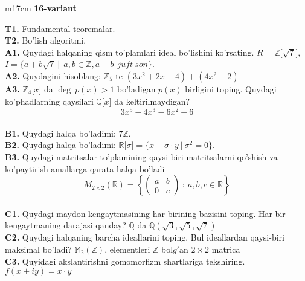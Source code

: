 \documentclass{article}
\begin{document}
\begin{tabular}{m{17cm}}
\textbf{16-variant}
\newline

\textbf{T1.} Fundamental teoremalar. \\
\textbf{T2.} Bo'lish algoritmi. \\
\textbf{A1.} Quydagi halqaning qism to'plamlari ideal bo'lishini ko'rsating.
\(R\mathbb{= Z\lbrack}\sqrt{7}\rbrack\), \(I = \{ a + b\sqrt{7}\ |\ \ a,b \in \mathbb{Z,}a - b\ \ juft\ son\}\). \\
\textbf{A2.} Quydagini hisoblang:
\(\mathbb{Z}_{5}\) te \(\left( 3x^{2} + 2x - 4 \right) + \left( 4x^{2} + 2 \right)\) \\
\textbf{A3.} \(\mathbb{Z}_{4}\lbrack x\rbrack\) da \(\deg\ p(x) > 1\) bo'ladigan \(p(x)\) birligini toping. Quydagi ko'phadlarning qaysilari \(\mathbb{Q\lbrack}x\rbrack\) da keltirilmaydigan?
\[3x^{5} - 4x^{3} - 6x^{2} + 6\] \\
\textbf{B1.} Quydagi halqa bo'ladimi:
\(7\mathbb{Z}\). \\
\textbf{B2.} Quydagi halqa bo'ladimi:
\(\mathbb{R\lbrack}\sigma\rbrack = \{ x + \sigma \cdot y\ |\ \sigma^{2} = 0\}\). \\
\textbf{B3.} Quydagi matritsalar to'plamining qaysi biri matritsalarni qo'shish va ko'paytirish amallarga qarata halqa bo'ladi
\[M_{2 \times 2}\mathbb{(R) =}\left\{ \begin{pmatrix}
a & b \\
0 & c
\end{pmatrix}\ :\ a,b,c \in \mathbb{R} \right\}\] \\
\textbf{C1.} Quydagi maydon kengaytmasining har birining bazisini toping. Har bir kengaytmaning darajasi qanday?
\(\mathbb{Q}\) da \(\mathbb{Q}\left( \sqrt{3},\sqrt{5},\sqrt{7} \right)\) \\
\textbf{C2.} Quydagi halqaning barcha ideallarini toping. Bul ideallardan qaysi-biri maksimal bo'ladi?
\(\mathbb{M}_{2}\left( \mathbb{Z} \right)\), elementleri \(\mathbb{Z}\) bol\(g'\)an \(2 \times 2\) matrica \\
\textbf{C3.} Quyidagi akslantirishni gomomorfizm shartlariga tekshiring. \(f(x + iy) = x \cdot y\) \\

\end{tabular}
\vspace{1cm}
\end{document}
